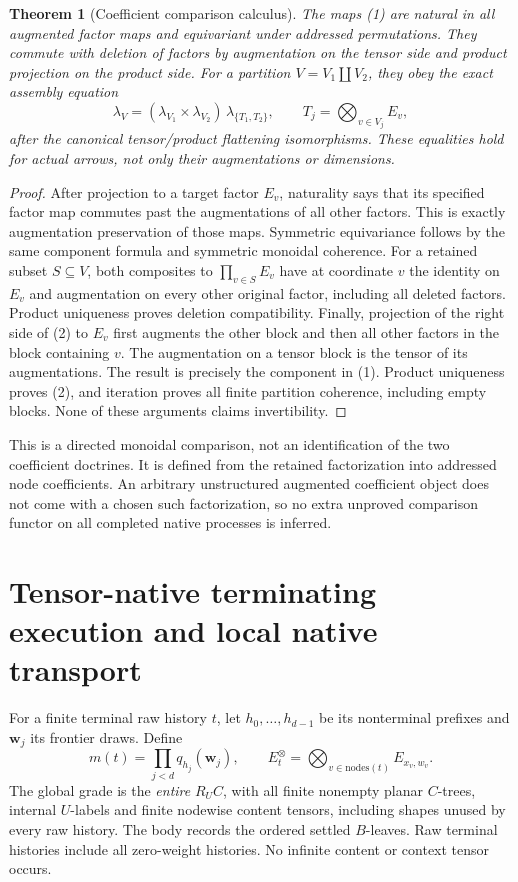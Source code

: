 \documentclass[11pt]{article}
\newtheorem{theorem}{Theorem}\newtheorem{proposition}[theorem]{Proposition}
\begin{document}
\begin{theorem}[Coefficient comparison calculus]
The maps (1) are natural in all augmented factor maps and equivariant under addressed permutations. They commute with deletion of factors by augmentation on the tensor side and product projection on the product side. For a partition $V=V_1\amalg V_2$, they obey the exact assembly equation
\[
 \lambda_V=
 (\lambda_{V_1}\times\lambda_{V_2})\,
 \lambda_{\{T_1,T_2\}},\qquad T_j=\bigotimes_{v\in V_j}E_v,          \tag{2}
\]
after the canonical tensor/product flattening isomorphisms. These equalities hold for actual arrows, not only their augmentations or dimensions.
\end{theorem}
\begin{proof}
After projection to a target factor $E_v$, naturality says that its specified factor map commutes past the augmentations of all other factors. This is exactly augmentation preservation of those maps. Symmetric equivariance follows by the same component formula and symmetric monoidal coherence. For a retained subset $S\subseteq V$, both composites to $\prod_{v\in S}E_v$ have at coordinate $v$ the identity on $E_v$ and augmentation on every other original factor, including all deleted factors. Product uniqueness proves deletion compatibility. Finally, projection of the right side of (2) to $E_v$ first augments the other block and then all other factors in the block containing $v$. The augmentation on a tensor block is the tensor of its augmentations. The result is precisely the component in (1). Product uniqueness proves (2), and iteration proves all finite partition coherence, including empty blocks. None of these arguments claims invertibility.
\end{proof}

This is a directed monoidal comparison, not an identification of the two coefficient doctrines. It is defined from the retained factorization into addressed node coefficients. An arbitrary unstructured augmented coefficient object does not come with a chosen such factorization, so no extra unproved comparison functor on all completed native processes is inferred.

\section{Tensor-native terminating execution and local native transport}
For a finite terminal raw history $t$, let $h_0,\ldots,h_{d-1}$ be its nonterminal prefixes and $\mathbf w_j$ its frontier draws. Define
\[
 m(t)=\prod_{j<d}q_{h_j}(\mathbf w_j),\qquad
 E_t^\otimes=\bigotimes_{v\in\mathrm{nodes}(t)}E_{x_v,w_v}.          \tag{3}
\]
The global grade is the \emph{entire} $R_UC$, with all finite nonempty planar $C$-trees, internal $U$-labels and finite nodewise content tensors, including shapes unused by every raw history. The body records the ordered settled $B$-leaves. Raw terminal histories include all zero-weight histories. No infinite content or context tensor occurs.
\end{document}
